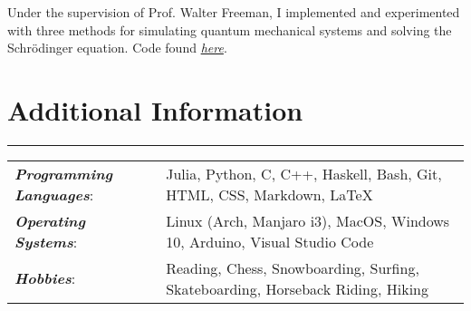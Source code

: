 \documentclass[9pt]{extarticle}
\newcommand{\myline}{\rule[\baselineskip]{\linewidth}{1pt}}
\begin{document}
\begin{compactitem}
\item Under the supervision of Prof. Walter Freeman, I implemented and experimented with three methods for simulating quantum mechanical systems and solving the Schr\"odinger equation. Code found \href{https://github.com/aarontrowbridge/Quantum}{\textit{here}}. 
\end{compactitem}



\section{Additional Information}
\myline

\normalsize

\begin{tabular}{ll}
\textbf{\textit{Programming Languages}}: & Julia, Python, C, C++,  Haskell, Bash, Git, HTML, CSS, Markdown, \LaTeX \\
\textbf{\textit{Operating Systems}}: & Linux (Arch, Manjaro i3), MacOS, Windows 10, Arduino, Visual Studio Code \\ 
\textbf{\textit{Hobbies}}: & Reading, Chess, Snowboarding, Surfing, Skateboarding, Horseback Riding, Hiking \\    
\end{tabular}
\end{document}
